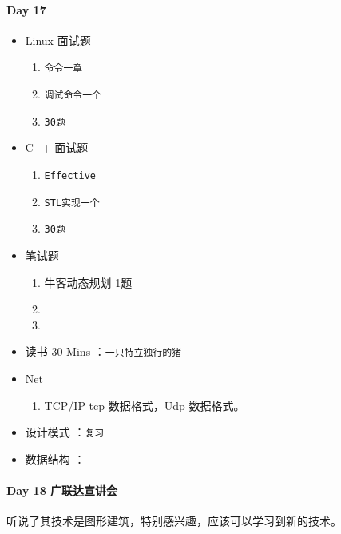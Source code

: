 \documentclass[UTF8,a4paper,8pt]{ctexart}
\begin{document}
 	 \paragraph{Day 17      \quad     }
	 	 \begin{itemize}[itemindent = 1em]
	 	 	\renewcommand\labelitemi{\makebox[0pt][l]{$\square$}\hspace{1em}} 
	 	 	\renewcommand\labelitemi{\makebox[0pt][l]{$\square$}\raisebox{.15ex}{\hspace{0.1em}$\checkmark$}}	 	
	 	 	\item   Linux 面试题
	 	 	\begin{enumerate}
	 	 		\item \verb|命令一章|
	 	 		\item \verb|调试命令一个|
	 	 		\item \verb|30题|
	 	 	\end{enumerate}
	 	 	\item   C++   面试题
	 	 	\begin{enumerate}
	 	 		\item \verb|Effective|
	 	 		\item \verb|STL实现一个|
	 	 		\item \verb|30题|
	 	 	\end{enumerate}
	 	 	
	 	 	\item  笔试题
	 	 	\begin{enumerate}
	 	 		\item 牛客动态规划 1题
	 	 		\item 
	 	 		\item 
	 	 	\end{enumerate}
	 	 	
	 	 	\item   读书  30 Mins	：\verb|一只特立独行的猪|
	 	 	\item   Net
	 	 	\begin{enumerate}
	 	 		\item TCP/IP  tcp 数据格式，Udp 数据格式。
	 	 	\end{enumerate}	
	 	 	
	 	 	\renewcommand\labelitemi{\makebox[0pt][l]{$\square$}\hspace{1em}}
	 	 	\item   设计模式 ：\verb|复习| 
	 	 	\item   数据结构 ：\verb|| 
	 	 \end{itemize}
	 	 
 	 \paragraph{Day 18  广联达宣讲会    \quad     }
	 	 听说了其技术是图形建筑，特别感兴趣，应该可以学习到新的技术。
	 	 
\end{document}
